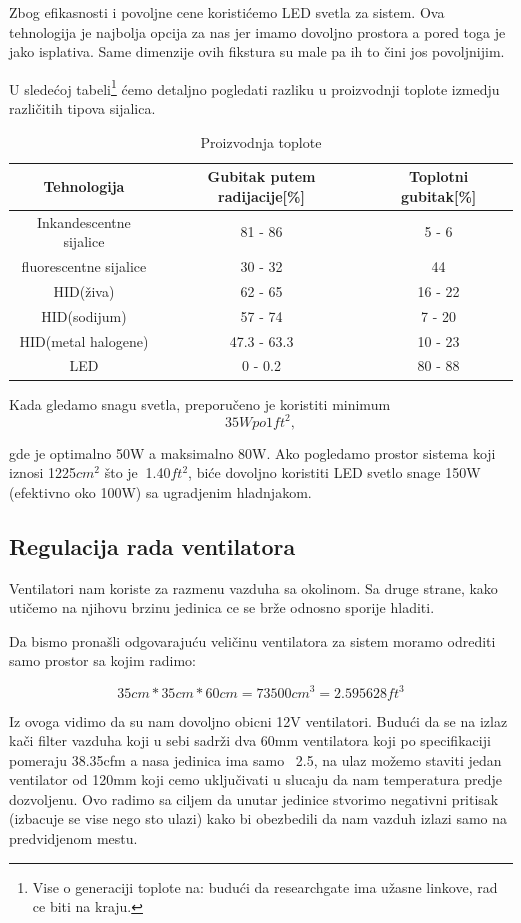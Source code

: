 \documentclass[a4paper,11pt]{book}
\begin{document}
Zbog efikasnosti i povoljne cene koristićemo LED svetla za sistem. Ova tehnologija je najbolja opcija za nas jer imamo dovoljno prostora a pored toga je jako isplativa. Same dimenzije ovih fikstura su male pa ih to čini jos povoljnijim.

U sledećoj tabeli\footnote{Vise o generaciji toplote na: budući da researchgate ima užasne linkove, rad ce biti na kraju.} ćemo detaljno pogledati razliku u proizvodnji toplote izmedju različitih tipova sijalica.


\begin{table}[ht]
  \caption{Proizvodnja toplote}
  \centering
  \begin{tabular}{|c|c|c|}
  \hline
    Tehnologija & Gubitak putem radijacije[\%] & Toplotni gubitak[\%] \\ \hline
  Inkandescentne sijalice & 81 - 86 & 5 - 6 \\ \hline
  fluorescentne sijalice & 30 - 32 & 44 \\ \hline
  HID(živa) & 62 - 65 & 16 - 22 \\ \hline
  HID(sodijum) & 57 - 74 & 7 - 20 \\ \hline
  HID(metal halogene) & 47.3 - 63.3 & 10 - 23 \\ \hline
  LED & 0 - 0.2 & 80 - 88 \\ \hline
  \end{tabular}
\end{table}

Kada gledamo snagu svetla, preporučeno je koristiti minimum 
\[35W po 1ft^2,\]

gde je optimalno 50W a maksimalno 80W. Ako pogledamo prostor sistema koji iznosi 1225$cm^2$ što je $~$1.40$ft^2$, biće dovoljno koristiti LED svetlo snage 150W (efektivno oko 100W) sa ugradjenim hladnjakom.



\subsection{Regulacija rada ventilatora}
Ventilatori nam koriste za razmenu vazduha sa okolinom. Sa druge strane, kako utičemo na njihovu brzinu jedinica ce se brže odnosno sporije hladiti.

Da bismo pronašli odgovarajuću veličinu ventilatora za sistem moramo odrediti samo prostor sa kojim radimo:

\[ 35cm * 35cm * 60cm =  73500cm^3 = 2.595628ft^3\]

Iz ovoga vidimo da su nam dovoljno obicni 12V ventilatori. Budući da se na izlaz kači filter vazduha koji u sebi sadrži dva 60mm ventilatora koji po specifikaciji pomeraju 38.35cfm a nasa jedinica ima samo ~2.5, na ulaz možemo staviti jedan ventilator od 120mm koji cemo uključivati u slucaju da nam temperatura predje dozvoljenu. Ovo radimo sa ciljem da unutar jedinice stvorimo negativni pritisak (izbacuje se vise nego sto ulazi) kako bi obezbedili da nam vazduh izlazi samo na predvidjenom mestu.
\end{document}
